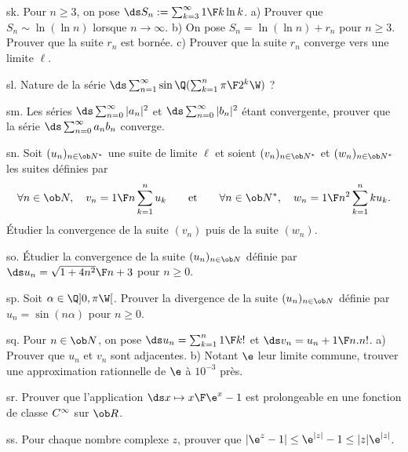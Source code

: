 \exo [Level=2,Fight=0,Learn=0,Type=\Exercices,Field=\Suites,Origin=] sk. 
Pour $n\ge3$, on pose $\ds S_n:=\sum_{k=3}^\infty{1\F k\ln k}$. \pn
a) Prouver que $S_n\sim\ln(\ln n)$ lorsque $n\to\infty$. \pn
b) On pose $S_n=\ln(\ln n)+r_n$ pour $n\ge3$. Prouver que la suite $r_n$ est bornée. \pn
c) Prouver que la suite $r_n$ converge vers une limite $\ell$. 

\exo [Level=2,Fight=0,Learn=0,Type=\Exercices,Field=\SériesNumériques,Origin=] sl. 
Nature de la série $\ds\sum_{n=1}^\infty\sin\Q(\sum_{k=1}^n{\pi\F 2^k}\W)$ ? 

\exo [Level=2,Fight=0,Learn=0,Type=\Exercices,Field=\SériesNumériques,Origin=] sm. 
Les séries $\ds\sum_{n=0}^\infty|a_n|^2$ et $\ds\sum_{n=0}^\infty|b_n|^2$ étant convergente, 
prouver que la série $\ds\sum_{n=0}^\infty a_nb_n$ converge. 

\exo [Level=2,Fight=0,Learn=0,Type=\Exercices,Field=\SériesNumériques,Origin=] sn. 
Soit $(u_n)_{n\in\ob N^*}$ une suite de limite $\ell$ et soient $(v_n)_{n\in\ob N^*}$ 
et $(w_n)_{n\in\ob N^*}$  
les suites définies par 
$$
\forall n\in\ob N, \quad v_n={1\F n}\sum_{k=1}^n u_k\qquad\hbox{et}\qquad\forall n\in\ob N^*, \quad w_n={1\F n^2}\sum_{k=1}^nku_k.
$$
\'Etudier la convergence de la suite $(v_n)$ puis de la suite $(w_n)$. 

\exo [Level=1,Fight=0,Learn=0,Type=\Exercices,Field=\Suites,Origin=] so. 
\'Etudier la convergence de la suite $(u_n)_{n\in\ob N}$ définie par 
$\ds u_n={\sqrt{1+4n^2}\F n+3}$ pour $n\ge0$. 

\exo [Level=1,Fight=0,Learn=0,Type=\Exercices,Field=\Suites,Origin=] sp. 
Soit $\alpha\in\Q]0,\pi\W[$. Prouver la divergence de la suite $(u_n)_{n\in\ob N}$ 
définie par $u_n=\sin(n\alpha)$ pour $n\ge0$. 

\exo [Level=1,Fight=0,Learn=0,Type=\Exercices,Field=\Suites,Origin=] sq. 
Pour $n\in\ob N$, on pose $\ds u_n=\sum_{k=1}^n{1\F k!}$ et $\ds v_n=u_n+{1\F n.n!}$. \pn
a) Prouver que $u_n$ et $v_n$ sont adjacentes. \pn 
b) Notant $\e$ leur limite commune, trouver une approximation rationnelle de $\e$ à $10^{-3}$ près. 

\exo [Level=2,Fight=0,Learn=0,Type=\Exercices,Field=\SériesEntières,Origin=] sr. 
Prouver que l'application $\ds x\mapsto {x\F \e^x-1}$ est prolongeable en une fonction de classe $\sc C^\infty$ sur $\ob R$. 

\exo [Level=2,Fight=0,Learn=0,Type=\Exercices,Field=\NombresComplexes,Origin=] ss. 
Pour chaque nombre complexe $z$, prouver que $|\e^z-1|\le \e^{|z|}-1\le |z|\e^{|z|}$. 

